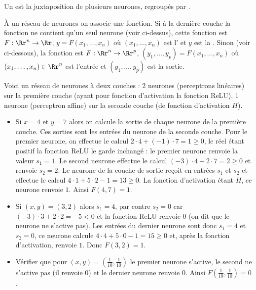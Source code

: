 \documentclass[11pt,class=report,crop=false]{standalone}
\begin{document}
Un  est la juxtaposition de plusieurs neurones, regroupés par . 




\`A un réseau de neurones on associe une fonction.
Si à la dernière couche la fonction ne contient qu'un seul neurone (voir ci-dessus), cette fonction est  
$F : \Rr^n \to \Rr$, $y = F(x_1,\ldots,x_n)$ où $(x_1,\ldots,x_n)$ est l' et $y$ est la .
Sinon (voir ci-dessous), la fonction est  
$F : \Rr^n \to \Rr^p$, $(y_1,\ldots,y_p) = F(x_1,\ldots,x_n)$ où $(x_1,\ldots,x_n) \in \Rr^n$ est l'entrée et $(y_1,\ldots,y_p)$ est la sortie.



\begin{exemple}
Voici un réseau de neurones à deux couches : $2$ neurones (perceptrons linéaires) sur la première couche (ayant pour fonction d'activation la fonction ReLU), $1$ neurone (perceptron affine) sur la seconde couche  (de fonction d'activation $H$).




\begin{itemize}
  \item Si $x=4$ et $y=7$ alors on calcule la sortie de chaque neurone de la première couche. Ces sorties sont les entrées du neurone de la seconde couche.
  Pour le premier neurone, on effectue le calcul $2\cdot4+(-1)\cdot7 = 1 \ge0$, le réel étant positif la fonction ReLU le garde inchangé : le premier neurone renvoie la valeur $s_1=1$. Le second neurone effectue le calcul $(-3)\cdot4+2\cdot7 = 2 \ge0$ et renvoie $s_2=2$.
  Le neurone de la couche de sortie reçoit en entrées $s_1$ et $s_2$ et effectue le calcul $4\cdot 1+5\cdot 2-1 = 13\ge0$. La fonction d'activation étant $H$, ce neurone renvoie $1$.  
  Ainsi $F(4,7)=1$.
  
  
  
  \item Si $(x,y)=(3,2)$ alors $s_1=4$, par contre $s_2=0$ car $(-3)\cdot3+2\cdot2 = -5 <0$ et la fonction ReLU renvoie $0$ (on dit que le neurone ne s'active pas). Les entrées du dernier neurone sont donc $s_1=4$ et $s_2=0$, ce neurone calcule $4\cdot 4 + 5\cdot0-1=15\ge0$ et, après la fonction d'activation, renvoie $1$. 
  Donc $F(3,2)=1$.
  
  \item Vérifier que pour $(x,y)=(\frac1{10},\frac1{10})$ le premier neurone s'active, le second ne s'active pas (il renvoie $0$) et le dernier neurone renvoie $0$. Ainsi $F(\frac1{10},\frac1{10})=0$.
\end{itemize}
\end{exemple}
\end{document}
